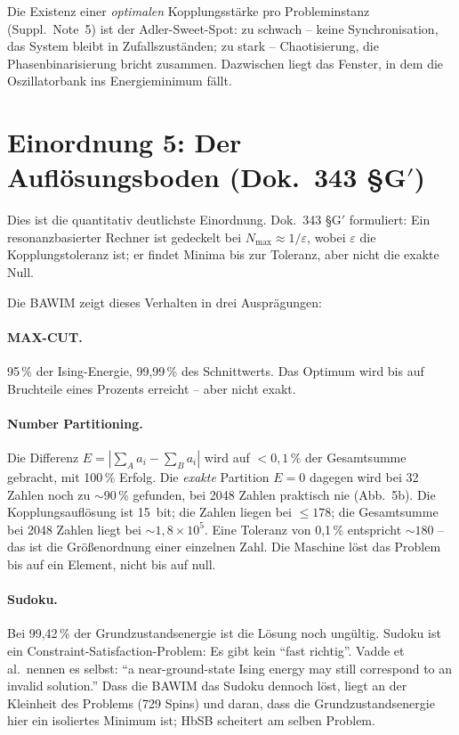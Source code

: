 Die Existenz einer \emph{optimalen} Kopplungsstärke pro Probleminstanz
(Suppl.\ Note~5) ist der Adler-Sweet-Spot: zu schwach -- keine
Synchronisation, das System bleibt in Zufallszuständen; zu stark --
Chaotisierung, die Phasenbinarisierung bricht zusammen. Dazwischen liegt
das Fenster, in dem die Oszillatorbank ins Energieminimum fällt. \SM

\section{Einordnung 5: Der Auflösungsboden (Dok.~343 §G$'$)}

Dies ist die quantitativ deutlichste Einordnung. Dok.~343 §G$'$ formuliert:
Ein resonanzbasierter Rechner ist gedeckelt bei $N_{\max}\approx1/\varepsilon$,
wobei $\varepsilon$ die Kopplungstoleranz ist; er findet Minima bis zur
Toleranz, aber nicht die exakte Null. \BM

Die BAWIM zeigt dieses Verhalten in drei Ausprägungen:

\paragraph{MAX-CUT.} 95\,\% der Ising-Energie, 99,99\,\% des Schnittwerts.
Das Optimum wird bis auf Bruchteile eines Prozents erreicht -- aber nicht
exakt.

\paragraph{Number Partitioning.} Die Differenz $E=|\sum_{A}a_i-\sum_{B}a_i|$
wird auf $<0{,}1\,\%$ der Gesamtsumme gebracht, mit 100\,\% Erfolg. Die
\emph{exakte} Partition $E=0$ dagegen wird bei 32 Zahlen noch zu $\sim$90\,\%
gefunden, bei 2048 Zahlen praktisch nie (Abb.~5b). Die Kopplungsauflösung
ist 15~bit; die Zahlen liegen bei $\le178$; die Gesamtsumme bei 2048 Zahlen
liegt bei $\sim1{,}8\times10^5$. Eine Toleranz von 0,1\,\% entspricht
$\sim180$ -- das ist die Größenordnung einer einzelnen Zahl. Die Maschine
löst das Problem bis auf ein Element, nicht bis auf null.

\paragraph{Sudoku.} Bei 99,42\,\% der Grundzustandsenergie ist die Lösung
noch ungültig. Sudoku ist ein Constraint-Satisfaction-Problem: Es gibt kein
\enquote{fast richtig}. Vadde et al.\ nennen es selbst: \enquote{a
near-ground-state Ising energy may still correspond to an invalid solution.}
Dass die BAWIM das Sudoku dennoch löst, liegt an der Kleinheit des Problems
(729 Spins) und daran, dass die Grundzustandsenergie hier ein isoliertes
Minimum ist; HbSB scheitert am selben Problem.

